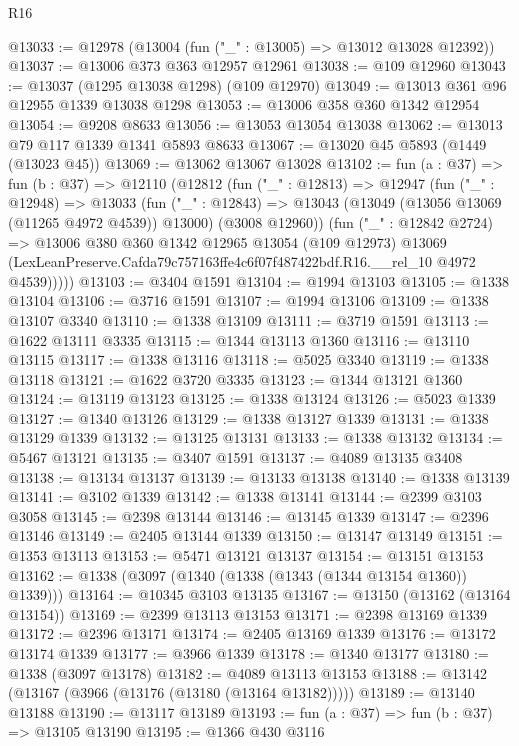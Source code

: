 \begin{lexlean}{R16}
\begin{coremodule}
@13033 := @12978 (@13004 (fun ("_" : @13005) => @13012 @13028 @12392))
@13037 := @13006 @373 @363 @12957 @12961
@13038 := @109 @12960
@13043 := @13037 (@1295 @13038 @1298) (@109 @12970)
@13049 := @13013 @361 @96 @12955 @1339 @13038 @1298
@13053 := @13006 @358 @360 @1342 @12954
@13054 := @9208 @8633
@13056 := @13053 @13054 @13038
@13062 := @13013 @79 @117 @1339 @1341 @5893 @8633
@13067 := @13020 @45 @5893 (@1449 (@13023 @45))
@13069 := @13062 @13067 @13028
@13102 := fun (a : @37) =>
  fun (b : @37) =>
  @12110
    (@12812
      (fun ("_" : @12813) =>
      @12947
        (fun ("_" : @12948) =>
        @13033
          (fun ("_" : @12843) =>
          @13043 (@13049 (@13056 @13069 (@11265 @4972 @4539)) @13000) (@3008 @12960))
          (fun ("_" : @12842 @2724) =>
          @13006
            @380
            @360
            @1342
            @12965
            @13054
            (@109 @12973)
            @13069
            (LexLeanPreserve.Cafda79c757163ffe4c6f07f487422bdf.R16.__rel_10 @4972 @4539)))))
@13103 := @3404 @1591
@13104 := @1994 @13103
@13105 := @1338 @13104
@13106 := @3716 @1591
@13107 := @1994 @13106
@13109 := @1338 @13107 @3340
@13110 := @1338 @13109
@13111 := @3719 @1591
@13113 := @1622 @13111 @3335
@13115 := @1344 @13113 @1360
@13116 := @13110 @13115
@13117 := @1338 @13116
@13118 := @5025 @3340
@13119 := @1338 @13118
@13121 := @1622 @3720 @3335
@13123 := @1344 @13121 @1360
@13124 := @13119 @13123
@13125 := @1338 @13124
@13126 := @5023 @1339
@13127 := @1340 @13126
@13129 := @1338 @13127 @1339
@13131 := @1338 @13129 @1339
@13132 := @13125 @13131
@13133 := @1338 @13132
@13134 := @5467 @13121
@13135 := @3407 @1591
@13137 := @4089 @13135 @3408
@13138 := @13134 @13137
@13139 := @13133 @13138
@13140 := @1338 @13139
@13141 := @3102 @1339
@13142 := @1338 @13141
@13144 := @2399 @3103 @3058
@13145 := @2398 @13144
@13146 := @13145 @1339
@13147 := @2396 @13146
@13149 := @2405 @13144 @1339
@13150 := @13147 @13149
@13151 := @1353 @13113
@13153 := @5471 @13121 @13137
@13154 := @13151 @13153
@13162 := @1338 (@3097 (@1340 (@1338 (@1343 (@1344 @13154 @1360)) @1339)))
@13164 := @10345 @3103 @13135
@13167 := @13150 (@13162 (@13164 @13154))
@13169 := @2399 @13113 @13153
@13171 := @2398 @13169 @1339
@13172 := @2396 @13171
@13174 := @2405 @13169 @1339
@13176 := @13172 @13174 @1339
@13177 := @3966 @1339
@13178 := @1340 @13177
@13180 := @1338 (@3097 @13178)
@13182 := @4089 @13113 @13153
@13188 := @13142 (@13167 (@3966 (@13176 (@13180 (@13164 @13182)))))
@13189 := @13140 @13188
@13190 := @13117 @13189
@13193 := fun (a : @37) => fun (b : @37) => @13105 @13190
@13195 := @1366 @430 @3116

\end{coremodule}
\end{lexlean}
